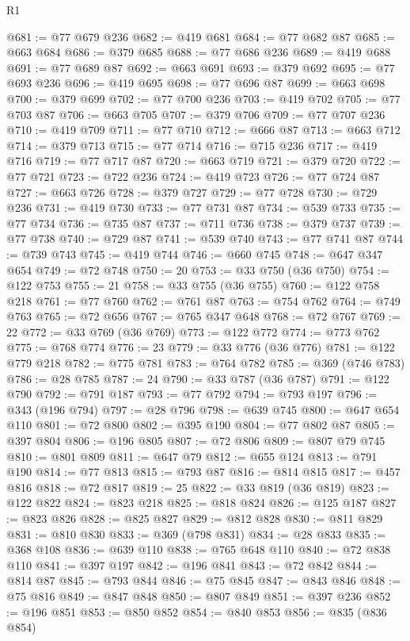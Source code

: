 \begin{lexlean}{R1}
\begin{coremodule}
@681 := @77 @679 @236
@682 := @419 @681
@684 := @77 @682 @87
@685 := @663 @684
@686 := @379 @685
@688 := @77 @686 @236
@689 := @419 @688
@691 := @77 @689 @87
@692 := @663 @691
@693 := @379 @692
@695 := @77 @693 @236
@696 := @419 @695
@698 := @77 @696 @87
@699 := @663 @698
@700 := @379 @699
@702 := @77 @700 @236
@703 := @419 @702
@705 := @77 @703 @87
@706 := @663 @705
@707 := @379 @706
@709 := @77 @707 @236
@710 := @419 @709
@711 := @77 @710
@712 := @666 @87
@713 := @663 @712
@714 := @379 @713
@715 := @77 @714
@716 := @715 @236
@717 := @419 @716
@719 := @77 @717 @87
@720 := @663 @719
@721 := @379 @720
@722 := @77 @721
@723 := @722 @236
@724 := @419 @723
@726 := @77 @724 @87
@727 := @663 @726
@728 := @379 @727
@729 := @77 @728
@730 := @729 @236
@731 := @419 @730
@733 := @77 @731 @87
@734 := @539 @733
@735 := @77 @734
@736 := @735 @87
@737 := @711 @736
@738 := @379 @737
@739 := @77 @738
@740 := @729 @87
@741 := @539 @740
@743 := @77 @741 @87
@744 := @739 @743
@745 := @419 @744
@746 := @660 @745
@748 := @647 @347 @654
@749 := @72 @748
@750 := 20
@753 := @33 @750 (@36 @750)
@754 := @122 @753
@755 := 21
@758 := @33 @755 (@36 @755)
@760 := @122 @758 @218
@761 := @77 @760
@762 := @761 @87
@763 := @754 @762
@764 := @749 @763
@765 := @72 @656
@767 := @765 @347 @648
@768 := @72 @767
@769 := 22
@772 := @33 @769 (@36 @769)
@773 := @122 @772
@774 := @773 @762
@775 := @768 @774
@776 := 23
@779 := @33 @776 (@36 @776)
@781 := @122 @779 @218
@782 := @775 @781
@783 := @764 @782
@785 := @369 (@746 @783)
@786 := @28 @785
@787 := 24
@790 := @33 @787 (@36 @787)
@791 := @122 @790
@792 := @791 @187
@793 := @77 @792
@794 := @793 @197
@796 := @343 (@196 @794)
@797 := @28 @796
@798 := @639 @745
@800 := @647 @654 @110
@801 := @72 @800
@802 := @395 @190
@804 := @77 @802 @87
@805 := @397 @804
@806 := @196 @805
@807 := @72 @806
@809 := @807 @79 @745
@810 := @801 @809
@811 := @647 @79
@812 := @655 @124
@813 := @791 @190
@814 := @77 @813
@815 := @793 @87
@816 := @814 @815
@817 := @457 @816
@818 := @72 @817
@819 := 25
@822 := @33 @819 (@36 @819)
@823 := @122 @822
@824 := @823 @218
@825 := @818 @824
@826 := @125 @187
@827 := @823 @826
@828 := @825 @827
@829 := @812 @828
@830 := @811 @829
@831 := @810 @830
@833 := @369 (@798 @831)
@834 := @28 @833
@835 := @368 @108
@836 := @639 @110
@838 := @765 @648 @110
@840 := @72 @838 @110
@841 := @397 @197
@842 := @196 @841
@843 := @72 @842
@844 := @814 @87
@845 := @793 @844
@846 := @75 @845
@847 := @843 @846
@848 := @75 @816
@849 := @847 @848
@850 := @807 @849
@851 := @397 @236
@852 := @196 @851
@853 := @850 @852
@854 := @840 @853
@856 := @835 (@836 @854)

\end{coremodule}
\end{lexlean}
